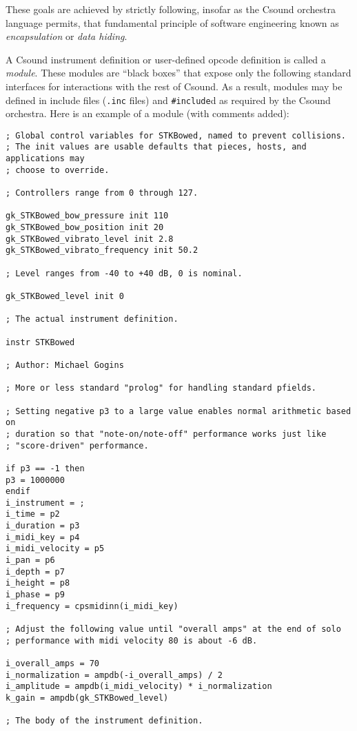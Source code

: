 \documentclass[12pt,letterpaper,onecolumn]{scrartcl}
\begin{document}
\noindent These goals are achieved by strictly following, insofar as the Csound orchestra language permits, that fundamental principle of software engineering known as \emph{encapsulation} or \emph{data hiding}. 

A Csound instrument definition or user-defined opcode definition is called a \emph{module}. These modules are ``black boxes'' that expose only the following standard interfaces for interactions with the rest of Csound. As a result, modules may be defined in include files (\texttt{.inc} files) and \texttt{\#include}d as required by the Csound orchestra. Here is an example of a module (with comments added):

\begin{lstlisting}
; Global control variables for STKBowed, named to prevent collisions.
; The init values are usable defaults that pieces, hosts, and applications may 
; choose to override.

; Controllers range from 0 through 127.

gk_STKBowed_bow_pressure init 110
gk_STKBowed_bow_position init 20
gk_STKBowed_vibrato_level init 2.8 
gk_STKBowed_vibrato_frequency init 50.2

; Level ranges from -40 to +40 dB, 0 is nominal.

gk_STKBowed_level init 0

; The actual instrument definition.

instr STKBowed

; Author: Michael Gogins

; More or less standard "prolog" for handling standard pfields.

; Setting negative p3 to a large value enables normal arithmetic based on 
; duration so that "note-on/note-off" performance works just like 
; "score-driven" performance.

if p3 == -1 then
p3 = 1000000
endif
i_instrument = ; 
i_time = p2
i_duration = p3
i_midi_key = p4
i_midi_velocity = p5
i_pan = p6
i_depth = p7
i_height = p8
i_phase = p9
i_frequency = cpsmidinn(i_midi_key)

; Adjust the following value until "overall amps" at the end of solo 
; performance with midi velocity 80 is about -6 dB.

i_overall_amps = 70
i_normalization = ampdb(-i_overall_amps) / 2
i_amplitude = ampdb(i_midi_velocity) * i_normalization
k_gain = ampdb(gk_STKBowed_level)

; The body of the instrument definition.


\end{lstlisting}
\end{document}
